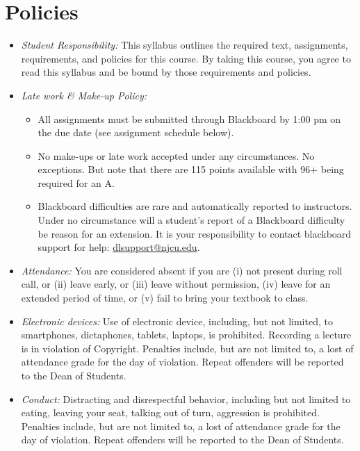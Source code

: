 \documentclass[11pt,article,oneside]{memoir}
\begin{document}
\section{Policies}
\begin{itemize}

\item \textit{Student Responsibility:} This syllabus outlines the required text, assignments, requirements, and policies for this course. By taking this course, you agree to read this syllabus and be bound by those requirements and policies. 

\item \textit{Late work \& Make-up Policy:} 
\begin{itemize}
\item All assignments must be submitted through Blackboard by 1:00 pm on the due date (see assignment schedule below).
\item No make-ups or late work accepted under any circumstances. No exceptions. But note that there are 115 points available with 96+ being required for an A.
\item Blackboard difficulties are rare and automatically reported to instructors. Under no circumstance will a student's report of a Blackboard difficulty be reason for an extension. It is your responsibility to contact blackboard support for help: \href{dlsupport@njcu.edu}{dlsupport@njcu.edu}. 

\end{itemize}

\item \textit{Attendance:} You are considered absent if you are (i) not present during roll call, or (ii) leave early, or (iii) leave without permission, (iv) leave for an extended period of time, or (v) fail to bring your textbook to class.

\item \textit{Electronic devices:} Use of electronic device, including, but not limited, to smartphones, dictaphones, tablets, laptops, is prohibited. Recording a lecture is in violation of Copyright. Penalties include, but are not limited to, a lost of attendance grade for the day of violation. Repeat offenders will be reported to the Dean of Students. 

\item \textit{Conduct:} Distracting and disrespectful behavior, including but not limited to eating, leaving your seat, talking out of turn, aggression is prohibited. Penalties include, but are not limited to, a lost of attendance grade for the day of violation. Repeat offenders will be reported to the Dean of Students. 


\end{itemize}
\end{document}
